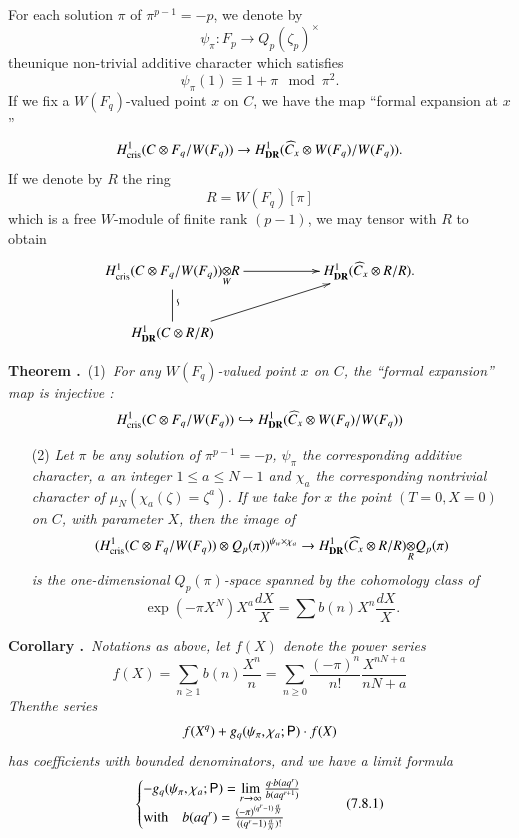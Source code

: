 For each solution $\pi$ of $\pi^{p-1}=-p$, we denote by
$$
\psi_{\pi}:F_{p}\to Q_{p}(\zeta_{p})^{\times}
$$
the\pageoriginale unique non-trivial additive character which satisfies
$$
\psi_{\pi}(1)\equiv 1+\pi \mod \pi^{2}.
$$
If we fix a $W(F_{q})$-valued point $x$ on $C$, we have the map ``formal expansion at $x$''
$$
H^{1}_{\operatorname{cris}}(C\otimes F_{q}/W(F_{q}))\to H^{1}_{\mathbf{DR}}(\widehat{C}_{x}\otimes W(F_{q})/W(F_{q})).
$$
If we denote by $R$ the ring
$$
R=W(F_{q})[\pi]
$$
which is a free $W$-module of finite rank $(p-1)$, we may tensor with $R$ to obtain 
\[
\xymatrix{
H^{1}_{\cris}(C\otimes F_{q}/W(F_{q})){\displaystyle{\mathop{\otimes}\limits_{W}}} R\ar@{-}[d]^{\rotatebox{90}{$\backsim$}}\ar[rr] & & H^{1}_{\DR}(\widehat{C}_{x}\otimes R/R).\\
  H^{1}_{\DR}(C\otimes R/R)\ar[urr] & 
}
\]

\noindent
{\bf Theorem .\label{art6-thm7.7}}~(1)~{\em For any $W(F_{q})$-valued point $x$ on $C$, the ``formal expansion'' map is injective :}
$$
H^{1}_{\operatorname{cris}}(C\otimes F_{q}/W(F_{q}))\hookrightarrow H^{1}_{\mathbf{DR}}(\widehat{C}_{x}\otimes W(F_{q})/W(F_{q}))
$$
\begin{itemize}
\item[(2)] {\em Let $\pi$ be any solution of $\pi^{p-1}=-p$, $\psi_{\pi}$ the corresponding additive character, $a$ an integer $1\leq a\leq N-1$ and $\chi_{a}$ the corresponding nontrivial character of $\mu_{N}(\chi_{a}(\zeta)=\zeta^{a})$. If we take for $x$ the point $(T=0,X=0)$ on $C$, with parameter $X$, then the image of}
$$
(H^{1}_{\cris}(C\otimes F_{q}/W(F_{q}))\otimes Q_{p}(\pi))^{\psi_{w}\times \chi_{a}}\to \foprod{H^{1}_{\DR}(\widehat{C}_{x}\otimes R/R)}{Q_{p}(\pi)}{R}
$$ 
{\em is the one-dimensional $Q_{p}(\pi)$-space spanned by the cohomology class of}
$$
\exp(-\pi X^{N})X^{a}\frac{dX}{X}=\sum b(n)X^{n}\frac{dX}{X}.
$$
\end{itemize}

\noindent
{\bf Corollary .\label{art6-coro7.8}}~{\em Notations as above, let $f(X)$ denote the power series}
$$
f(X)=\sum\limits_{n\geq 1}b(n)\frac{X^{n}}{n}=\sum\limits_{n\geq 0}\frac{(-\pi)^{n}}{n!}\frac{X^{nN+a}}{nN+a}
$$
{\em Then\pageoriginale the series}
$$
f(X^{q})+g_{q}(\psi_{\pi},\chi_{a};\mathsf{P})\cdot f(X)
$$
{\em has coefficients with bounded denominators, and we have a limit formula}
\begin{equation*}
\begin{cases}
-g_{q}(\psi_{\pi},\chi_{a};\mathsf{P})=\lim\limits_{r\to \infty}\frac{q\cdot b(aq^{r})}{b(aq^{r+1})}\\[4pt]
\text{with}\quad b(aq^{r})=\frac{(-\pi)^{(q^{r}-1)\frac{a}{N}}}{((q^{r}-1)\frac{a}{N})!}
\end{cases}\tag{7.8.1}\label{art6-eq7.8.1}
\end{equation*}

